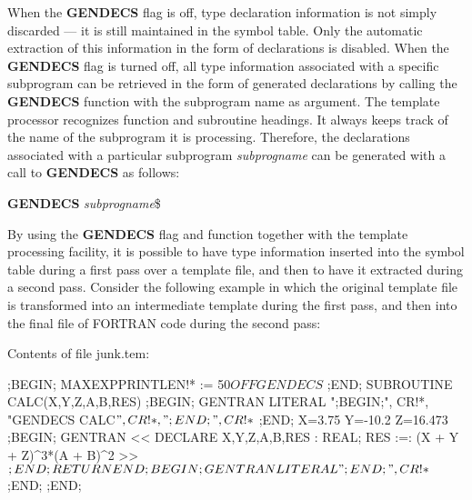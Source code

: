 When the {\bf GENDECS} flag is off, type declaration information is not
simply discarded --- it is still maintained in the symbol table.  Only the
automatic extraction of this information in the form of declarations is
disabled.  When the {\bf GENDECS} flag is turned off, all type
information associated with a specific subprogram can be retrieved in the
form of generated declarations by calling the {\bf GENDECS} function with
the subprogram name as argument.  The template processor recognizes
function and subroutine headings.  It always keeps track of the name of
the subprogram it is processing.  Therefore, the declarations associated with
a particular subprogram {\it subprogname} can be generated with a call to
{\bf GENDECS} as follows:
\begin{center}
{\bf GENDECS} {\it subprogname}\$
\end{center}

By using the {\bf GENDECS} flag and function together with the template
processing facility, it is possible to have type information
inserted into the symbol table during a first pass over a template file, and
then to have it extracted during a second pass.  Consider the following
example in which the original template file is transformed into an
intermediate template during the first pass, and then into the final file
of FORTRAN code during the second pass:

Contents of file junk.tem:
\begin{framedverbatim}
;BEGIN;                                       
MAXEXPPRINTLEN!* := 50$                       
OFF GENDECS$                                  
;END;                                         
      SUBROUTINE CALC(X,Y,Z,A,B,RES)          
;BEGIN;                                       
GENTRAN LITERAL ";BEGIN;", CR!*,              
                "GENDECS CALC$", CR!*,        
                 ";END;", CR!*$                
;END;                                         
      X=3.75                                  
      Y=-10.2                                 
      Z=16.473                                
;BEGIN;                                       
GENTRAN                                       
<<                                            
    DECLARE X,Y,Z,A,B,RES : REAL;           
    RES :=: (X + Y + Z)^3*(A + B)^2           
>>$                                           
;END;                                         
      RETURN                                  
      END                                     
;BEGIN;                                       
GENTRAN LITERAL ";END;", CR!*$                
;END;                                         
;END;                                         
\end{framedverbatim} 

